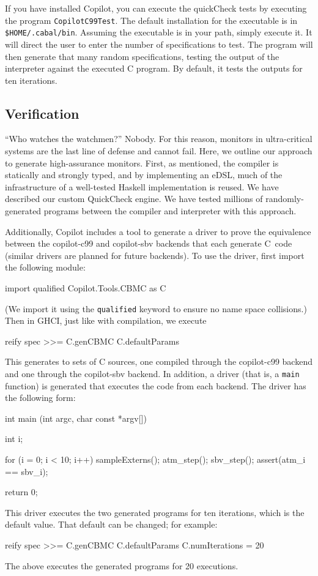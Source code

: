 \documentclass[]{article}
\theoremstyle{example}
\begin{document}
If you have installed Copilot, you can execute the quickCheck tests by executing
the program {\tt CopilotC99Test}.  The default installation for the executable
is in {\tt \$HOME/.cabal/bin}. Assuming the executable is in your path, simply
execute it.  It will direct the user to enter the number of specifications to
test.  The program will then generate that many random specifications, testing
the output of the interpreter against the executed C program.  By default, it
tests the outputs for ten iterations.


\subsection{Verification}
``Who watches the watchmen?''  Nobody.  For this reason, monitors in
ultra-critical systems are the last line of defense and cannot fail.  Here, we
outline our approach to generate high-assurance monitors.  First, as mentioned,
the compiler is statically and strongly typed, and by implementing an eDSL, much
of the infrastructure of a well-tested Haskell implementation is reused.  We
have described our custom QuickCheck engine.  We have tested millions of
randomly-generated programs between the compiler and interpreter with this approach.

Additionally, Copilot includes a tool to generate a driver to prove the
equivalence between the copilot-c99 and copilot-sbv backends that each generate
C~code (similar drivers are planned for future backends).  To use the driver,
first import the following module:
%
\begin{code}
import qualified Copilot.Tools.CBMC as C
\end{code}
%
\noindent
(We import it using the {\tt qualified} keyword to ensure no name space
collisions.)  Then in GHCI, just like with compilation, we execute
%
\begin{code}
reify spec >>= C.genCBMC C.defaultParams  
\end{code}
%
\noindent
This generates to sets of C sources, one compiled through the copilot-c99
backend and one through the copilot-sbv backend.  In addition, a driver (that is, a
{\tt main} function) is generated that executes the code from each backend.  The
driver has the following form:
%
\begin{code}
int main (int argc, char const *argv[])
{
  int i;

  for (i = 0; i < 10; i++)
  {
    sampleExterns();
    atm_step();
    sbv_step();
    assert(atm_i == sbv_i);
  }

  return 0;
}
\end{code}
%
This driver executes the two generated programs for ten iterations, which is the
default value.  That default can be changed; for example:
%
\begin{code}
reify spec >>= 
  C.genCBMC C.defaultParams {C.numIterations = 20}
\end{code}
%
\noindent
The above executes the generated programs for 20 executions.
\end{document}
